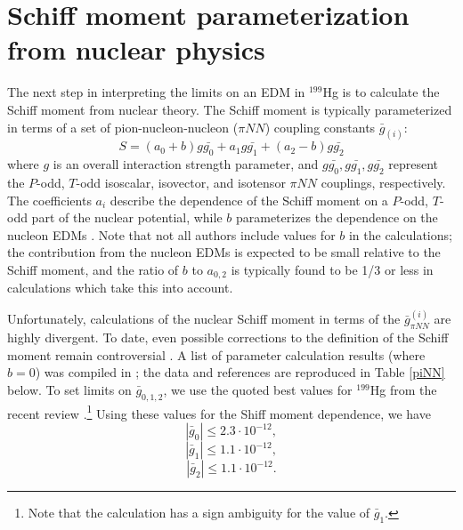 \documentclass [10pt, twoside] {uwthesis}[2012/04/02]
\begin{document}
\section{Schiff moment parameterization from nuclear physics}
The next step in interpreting the limits on an EDM in $^{199}$Hg is to calculate the Schiff moment from nuclear theory. The Schiff moment is typically parameterized in terms of a set of pion-nucleon-nucleon ($\pi NN$) coupling constants $\bar{g}_{(i)}$:
\begin{equation}
S = (a_0 + b) g\bar{g_0} + a_1 g\bar{g_1} + (a_2 - b)g\bar{g_2}
\end{equation}	 
where $g$ is an overall interaction strength parameter, and $g\bar{g_0}, g\bar{g_1}, g\bar{g_2}$ represent the $P$-odd, $T$-odd isoscalar, isovector, and isotensor $\pi NN$ couplings, respectively. The coefficients $a_i$ describe the dependence of the Schiff moment on a $P$-odd, $T$-odd part of the nuclear potential, while $b$ parameterizes the dependence on the nucleon EDMs \cite{2010_Engel_self-consistent_Schiff_moments}. Note that not all authors include values for $b$ in the calculations; the contribution from the nucleon EDMs is expected to be small relative to the Schiff moment, and the ratio of $b$ to $a_{0,2}$ is typically found to be 1/3 or less in calculations which take this into account.

Unfortunately, calculations of the nuclear Schiff moment in terms of the $\bar{g}_{\pi NN}^{(i)}$ are highly divergent. To date, even possible corrections to the definition of the Schiff moment remain controversial \cite{2007_Liu_et._al._Schiff_Theorem_and_Corrections, 2008_Schiff_Theorem_Rederivation}. A list of parameter calculation results (where $b=0$) was compiled in \cite{2013_Engel_et_al_EDM_review}; the data and references are reproduced in Table \ref{piNN} below. To set limits on $\bar{g}_{0,1,2}$, we use the quoted best values for $^{199}$Hg from the recent review \cite{2013_Engel_et_al_EDM_review}.\footnote{Note that the calculation has a sign ambiguity for the value of $\bar{g}_1$.} Using these values for the Shiff moment dependence, we have
\begin{equation}
|\bar{g}_0| \leq 2.3\cdot 10^{-12}, 
\end{equation}
\begin{equation}
|\bar{g}_1| \leq 1.1\cdot 10^{-12},
\end{equation}
\begin{equation}
|\bar{g}_2| \leq 1.1\cdot 10^{-12}. 
\end{equation}
\end{document}
